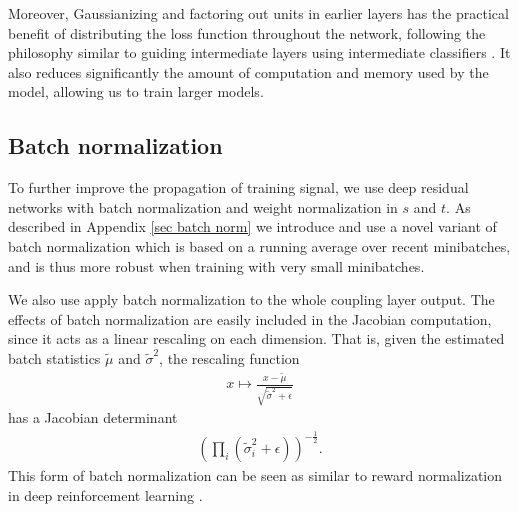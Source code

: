 \documentclass{article}
\begin{document}
Moreover, Gaussianizing and factoring out units in earlier layers has the practical benefit of distributing the loss function throughout the network, following the philosophy similar to guiding intermediate layers using intermediate classifiers \citep{lee2014deeply}. It also reduces significantly the amount of computation and memory used by the model, allowing us to train larger models.


\subsection{Batch normalization}
To further improve the propagation of training signal, we use deep residual networks \citep{DBLP:journals/corr/HeZRS15, DBLP:journals/corr/HeZR016} with batch normalization \citep{ioffe2015batch} and weight normalization \citep{badrinarayanan2015understanding, salimans2016weight} in $s$ and $t$.
As described in Appendix \ref{sec batch norm} we introduce and use a novel variant of batch normalization which is based on a running average over recent minibatches, and is thus more robust when training with very small minibatches.

We also use apply batch normalization to the whole coupling layer output.
The effects of batch normalization are easily included in the Jacobian computation, since it acts as a linear rescaling on each dimension. That is, given the estimated batch statistics $\tilde{\mu}$ and $\tilde{\sigma}^{2}$, the rescaling function
\begin{align}
x \mapsto \frac{x - \tilde{\mu}}{\sqrt{\tilde{\sigma}^{2} + \epsilon}}
\end{align}
has a Jacobian determinant
\begin{align}
\left(\prod_{i}{(\tilde{\sigma}_{i}^{2} + \epsilon)}\right)^{-\frac{1}{2}}.
\end{align}
This form of batch normalization can be seen as similar to reward normalization in deep reinforcement learning \citep{mnih2015human, van2016learning}.
\end{document}

